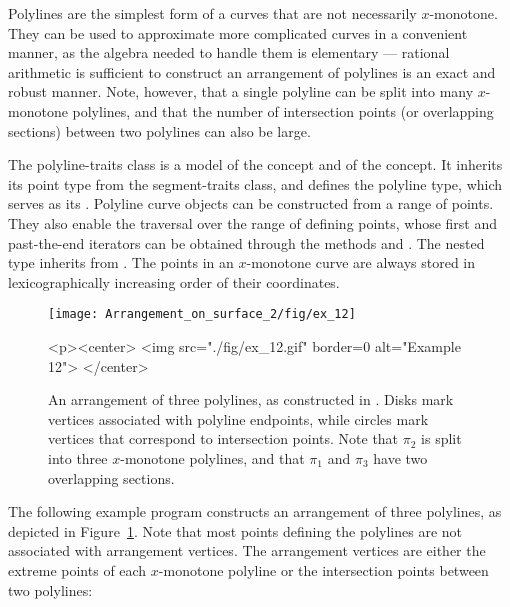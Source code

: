 Polylines are the simplest form of a curves that are not
necessarily $x$-monotone. They can be used to approximate more
complicated curves in a convenient manner, as the algebra needed
to handle them is elementary --- rational arithmetic is sufficient
to construct an arrangement of polylines is an exact and robust
manner. Note, however, that a single polyline can be split into
many $x$-monotone polylines, and that the number of intersection
points (or overlapping sections) between two polylines can also
be large. 

The polyline-traits class is a model of the 
concept and of the  concept.
It inherits its point type from the segment-traits class, and defines
the polyline type, which serves as its . Polyline curve
objects can be constructed from a range of points. They also enable
the traversal over the range of defining points, whose first and
past-the-end iterators can be obtained through the methods 
and . The nested  type inherits
from . The points in an $x$-monotone curve are
always stored in lexicographically increasing order of their
coordinates.

\begin{figure}[t]
\begin{ccTexOnly}
  \begin{center}
  \texttt{[image: Arrangement\_on\_surface\_2/fig/ex\_12]}
  \end{center}
\end{ccTexOnly}
\begin{ccHtmlOnly}
  <p><center>
  <img src="./fig/ex_12.gif" border=0 alt="Example 12">
  </center>
\end{ccHtmlOnly}
\caption{An arrangement of three polylines, as constructed in
. Disks mark vertices associated with
polyline endpoints, while circles mark vertices that correspond
to intersection points. Note that $\pi_2$ is split into three
$x$-monotone polylines, and that $\pi_1$ and $\pi_3$ have two
overlapping sections.\label{arr_fig:ex_12}}
\end{figure}

The following example program constructs an arrangement of three
polylines, as depicted in Figure~\ref{arr_fig:ex_12}. Note that
most points defining the polylines are not associated with arrangement
vertices. The arrangement vertices are either the extreme points of
each $x$-monotone polyline or the intersection points between two
polylines:

